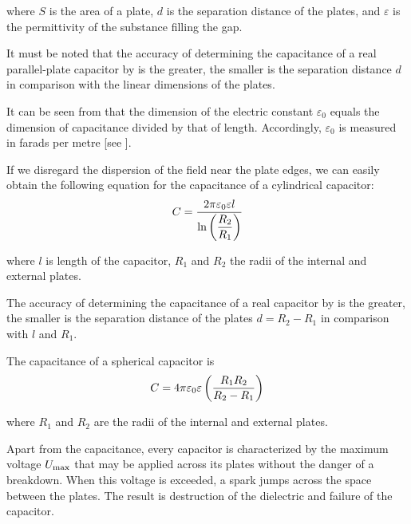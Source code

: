 \noindent
where $S$ is the area of a plate, $d$ is the separation distance of the plates, and $\varepsilon$ is the permittivity of the substance filling the gap.

It must be noted that the accuracy of determining the capacitance of a real parallel-plate capacitor by  is the greater, the smaller is the separation distance $d$ in comparison with the linear dimensions of the plates.

It can be seen from  that the dimension of the electric constant $\varepsilon_0$ equals the dimension of capacitance divided by that of length. Accordingly, $\varepsilon_0$ is measured in farads per metre [see ].

If we disregard the dispersion of the field near the plate edges, we can easily obtain the following equation for the capacitance of a cylindrical capacitor:
\begin{equation}\label{eq:3_13}
    C = \frac{2\pi\varepsilon_0\varepsilon l}{\ln\left(\dfrac{R_2}{R_1}\right)}
\end{equation}

\noindent
where $l$ is length of the capacitor, $R_1$ and $R_2$ the radii of the internal and external plates.

The accuracy of determining the capacitance of a real capacitor by  is the greater, the smaller is the separation distance of the plates $d=R_2-R_1$ in comparison with $l$ and $R_1$.

The capacitance of a spherical capacitor is
\begin{equation}\label{eq:3_14}
    C = 4\pi\varepsilon_0\varepsilon \left(\frac{R_1 R_2}{R_2 - R_1}\right)
\end{equation}

\noindent
where $R_1$ and $R_2$ are the radii of the internal and external plates.

Apart from the capacitance, every capacitor is characterized by the maximum voltage $U_{\text{max}}$ that may be applied across its plates without the danger of a breakdown. When this voltage is exceeded, a spark jumps across the space between the plates. The result is destruction of the dielectric and failure of the capacitor.
